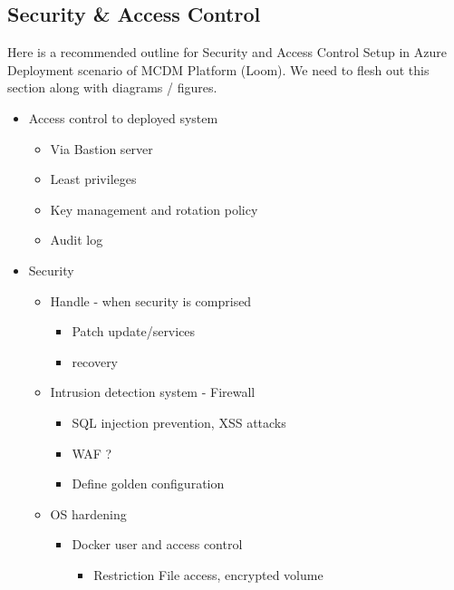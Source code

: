 \documentclass[letterpaper,10pt,english]{sphinxmanual}
\begin{document}
\subsection{Security \& Access Control}
\label{\detokenize{loom_installation_guide:security-access-control}}
Here is a recommended outline for Security and Access Control Setup in Azure Deployment scenario of MCDM Platform (Loom). We need to flesh out this section along with diagrams / figures.
\begin{itemize}
\item {} 
Access control to deployed system
\begin{itemize}
\item {} 
Via Bastion server

\end{itemize}
\begin{itemize}
\item {} 
Least privileges

\end{itemize}
\begin{itemize}
\item {} 
Key management and rotation policy

\item {} 
Audit log

\end{itemize}

\item {} 
Security
\begin{itemize}
\item {} 
Handle - when security is comprised
\begin{itemize}
\item {} 
Patch update/services

\item {} 
recovery

\end{itemize}

\item {} 
Intrusion detection system - Firewall
\begin{itemize}
\item {} 
SQL injection prevention, XSS attacks

\item {} 
WAF ?

\item {} 
Define golden configuration

\end{itemize}

\item {} 
OS hardening
\begin{itemize}
\item {} 
Docker user and access control
\begin{itemize}
\item {} 
Restriction File access, encrypted volume


\end{itemize}
\end{itemize}
\end{itemize}
\end{itemize}
\end{document}
